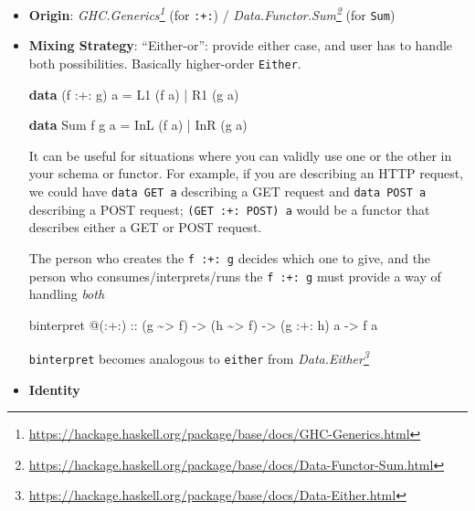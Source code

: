 \documentclass[]{article}
\newenvironment{Shaded}{}{}
\newcommand{\DataTypeTok}[1]{\textcolor[rgb]{0.56,0.13,0.00}{#1}}
\newcommand{\KeywordTok}[1]{\textcolor[rgb]{0.00,0.44,0.13}{\textbf{#1}}}
\newcommand{\NormalTok}[1]{#1}
\newcommand{\OperatorTok}[1]{\textcolor[rgb]{0.40,0.40,0.40}{#1}}
\newcommand{\OtherTok}[1]{\textcolor[rgb]{0.00,0.44,0.13}{#1}}
\renewcommand{\href}[2]{#2\footnote{\url{#1}}}
\begin{document}
\begin{itemize}
\item
  \textbf{Origin}:
  \emph{\href{https://hackage.haskell.org/package/base/docs/GHC-Generics.html}{GHC.Generics}}
  (for \texttt{:+:}) /
  \emph{\href{https://hackage.haskell.org/package/base/docs/Data-Functor-Sum.html}{Data.Functor.Sum}}
  (for \texttt{Sum})
\item
  \textbf{Mixing Strategy}: ``Either-or'': provide either case, and user has to
  handle both possibilities. Basically higher-order \texttt{Either}.

\begin{Shaded}
\begin{Highlighting}[]
\KeywordTok{data}\NormalTok{ (f }\OperatorTok{:+:}\NormalTok{ g) a}
    \OtherTok{=} \DataTypeTok{L1}\NormalTok{ (f a)}
    \OperatorTok{|} \DataTypeTok{R1}\NormalTok{ (g a)}

\KeywordTok{data} \DataTypeTok{Sum}\NormalTok{ f g a}
    \OtherTok{=} \DataTypeTok{InL}\NormalTok{ (f a)}
    \OperatorTok{|} \DataTypeTok{InR}\NormalTok{ (g a)}
\end{Highlighting}
\end{Shaded}

  It can be useful for situations where you can validly use one or the other in
  your schema or functor. For example, if you are describing an HTTP request, we
  could have \texttt{data\ GET\ a} describing a GET request and
  \texttt{data\ POST\ a} describing a POST request; \texttt{(GET\ :+:\ POST)\ a}
  would be a functor that describes either a GET or POST request.

  The person who creates the \texttt{f\ :+:\ g} decides which one to give, and
  the person who consumes/interprets/runs the \texttt{f\ :+:\ g} must provide a
  way of handling \emph{both}

\begin{Shaded}
\begin{Highlighting}[]
\NormalTok{binterpret }\OperatorTok{@}\NormalTok{(}\OperatorTok{:+:}\NormalTok{)}
\OtherTok{    ::}\NormalTok{ (g }\OperatorTok{\textasciitilde{}>}\NormalTok{ f)}
    \OtherTok{{-}>}\NormalTok{ (h }\OperatorTok{\textasciitilde{}>}\NormalTok{ f)}
    \OtherTok{{-}>}\NormalTok{ (g }\OperatorTok{:+:}\NormalTok{ h) a}
    \OtherTok{{-}>}\NormalTok{ f a}
\end{Highlighting}
\end{Shaded}

  \texttt{binterpret} becomes analogous to \texttt{either} from
  \emph{\href{https://hackage.haskell.org/package/base/docs/Data-Either.html}{Data.Either}}
\item
  \textbf{Identity}


\end{itemize}
\end{document}
